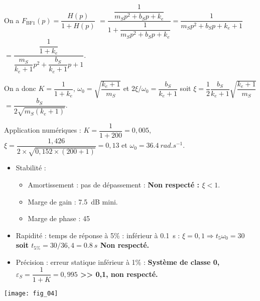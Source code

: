 \ifprof
\begin{corrige}
On a $F_{\text{BF1}}(p) = \dfrac{H(p)}{1+H(p)} $ $=\dfrac{\dfrac{1}{m_S p^2 + b_S p + k_e}}{1+\dfrac{1}{m_S p^2 + b_S p + k_e}} = \dfrac{1}{m_S p^2 + b_S p + k_e+1}$
$= \dfrac{\dfrac{1}{1+k_e}}{\dfrac{m_S}{ k_e+1} p^2 + \dfrac{b_S}{ k_e+1} p +1}$.

On a donc $K  = \dfrac{1}{1+k_e}$, $\omega_0 = \sqrt{\dfrac{k_e+1}{m_S}}$ et $2\xi / \omega_0 = \dfrac{b_S}{ k_e+1}$ soit $\xi = \dfrac{1}{2}\dfrac{b_S}{ k_e+1}  \sqrt{\dfrac{k_e+1}{m_S}} $ $= \dfrac{b_S }{2  \sqrt{m _S(k_e +1) }}$. 

Application numériques : 
$K = \dfrac{1}{1+200} = 0,005$, $\xi = \dfrac{1,426}{2 \times  \sqrt{0,152\times (200 +1)}}=0,13$ et $\omega_0 = \SI{36,4}{rad.s^{-1}}$.
\end{corrige}
\else
\fi

\ifprof
\begin{corrige}
\begin{itemize}
\item Stabilité : 
\begin{itemize}
\item Amortissement : pas de dépassement : \textbf{Non respecté : $\xi <1$}. 
\item Marge de gain : \SI{7,5}{dB} mini.
\item Marge de phase : \SI{45}{\degres} 
\end{itemize}
\item Rapidité : temps de réponse à 5\% : inférieur à \SI{0,1}{s} : \textbf{$\xi = 0,1 \Rightarrow t_5\omega_0 = 30$ soit $t_{5\%} = 30 / 36,4 =\SI{0,8}{s}$ Non respecté.}
\item Précision : erreur statique inférieur à 1\%  : \textbf{Système de classe 0, $\varepsilon_S = \dfrac{1}{1+K} = 0,995$  >> 0,1, non respecté.}
\end{itemize}
\end{corrige}
\else
\fi


\begin{marginfigure}
\texttt{[image: fig\_04]}
\end{marginfigure}


